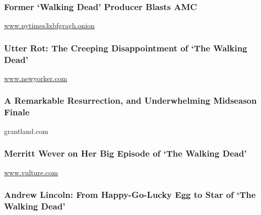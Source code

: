 \hypertarget{former-walking-dead-producer-blasts-amc}{%
\subsubsection{Former `Walking Dead' Producer Blasts
AMC}\label{former-walking-dead-producer-blasts-amc}}

\href{http://www.nytimes3xbfgragh.onion}{www.nytimes3xbfgragh.onion}

\href{http://www.newyorker.com/magazine/2013/12/23/utter-rot}{}

\hypertarget{utter-rot-the-creeping-disappointment-of-the-walking-dead}{%
\subsubsection{Utter Rot: The Creeping Disappointment of `The Walking
Dead'}\label{utter-rot-the-creeping-disappointment-of-the-walking-dead}}

\href{http://www.newyorker.com}{www.newyorker.com}

\href{http://grantland.com/hollywood-prospectus/walking-dead-2014-midseason-finale-recap/}{}

\hypertarget{a-remarkable-resurrection-and-underwhelming-midseason-finale}{%
\subsubsection{A Remarkable Resurrection, and Underwhelming Midseason
Finale}\label{a-remarkable-resurrection-and-underwhelming-midseason-finale}}

grantland.com

\href{http://www.vulture.com/2016/03/merritt-wever-walking-dead.html}{}

\hypertarget{merritt-wever-on-her-big-episode-of-the-walking-dead}{%
\subsubsection{Merritt Wever on Her Big Episode of `The Walking
Dead'}\label{merritt-wever-on-her-big-episode-of-the-walking-dead}}

\href{http://www.vulture.com}{www.vulture.com}

\href{https://www.theguardian.com/tv-and-radio/2015/oct/09/andrew-lincoln-profile-happy-go-lucky-egg-walking-dead}{}

\hypertarget{andrew-lincoln-from-happy-go-lucky-egg-to-star-of-the-walking-dead}{%
\subsubsection{Andrew Lincoln: From Happy-Go-Lucky Egg to Star of `The
Walking
Dead'}\label{andrew-lincoln-from-happy-go-lucky-egg-to-star-of-the-walking-dead}}

